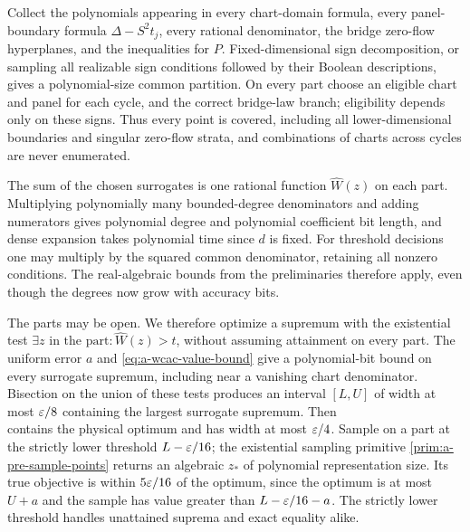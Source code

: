 Collect the polynomials appearing in every chart-domain formula, every
panel-boundary formula $\Delta-S^2t_j$, every rational denominator, the
bridge zero-flow hyperplanes, and the inequalities for $P$. Fixed-dimensional
sign decomposition, or sampling all realizable sign conditions followed
by their Boolean descriptions, gives a polynomial-size common partition.
On every part choose an eligible chart and panel for each cycle, and the
correct bridge-law branch; eligibility depends only on these signs.
Thus every point is covered, including all lower-dimensional boundaries
and singular zero-flow strata, and combinations of charts across cycles
are never enumerated.

The sum of the chosen surrogates is one rational function $\widehat W(z)$
on each part. Multiplying polynomially many bounded-degree denominators
and adding numerators gives polynomial degree and polynomial coefficient
bit length, and dense expansion takes polynomial time since $d$ is fixed.
For threshold decisions one may multiply by the squared common
denominator, retaining all nonzero conditions. The real-algebraic bounds
from the preliminaries therefore apply, even though the degrees now grow
with accuracy bits.

The parts may be open. We therefore optimize a supremum with the
existential test $\exists z\text{ in the part}:\widehat W(z)>t$, without
assuming attainment on every part. The uniform error $a$ and
\eqref{eq:a-wcac-value-bound} give a polynomial-bit bound on every
surrogate supremum, including near a vanishing chart denominator.
Bisection on the union of these tests produces an interval $[L,U]$ of
width at most $\varepsilon/8$ containing the largest surrogate supremum.
Then
\begin{equation}
 [L-a,U+a]
 \label{eq:a-wcac-certified-interval}
\end{equation}
contains the physical optimum and has width at most $\varepsilon/4$.
Sample on a part at the strictly lower threshold $L-\varepsilon/16$;
the existential sampling primitive \cref{prim:a-pre-sample-points}
returns an algebraic $z_*$ of polynomial representation size. Its true
objective is within $5\varepsilon/16$ of the optimum, since the optimum is at
most $U+a$ and the sample has value greater than $L-\varepsilon/16-a$. The
strictly lower threshold handles unattained suprema and exact equality
alike.

